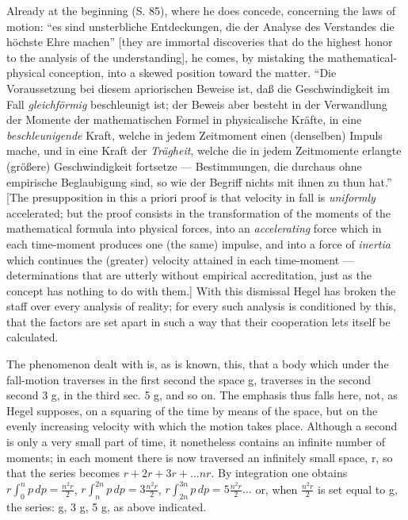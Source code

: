 \documentclass[12pt]{book}
\begin{document}
Already at the beginning (S. 85), where he does concede, concerning the laws of motion: ``es sind
unsterbliche Entdeckungen, die der Analyse des Verstandes die höchste Ehre machen'' [they are immortal
discoveries that do the highest honor to the analysis of the understanding], he comes, by mistaking the
mathematical-physical conception, into a skewed position toward the matter. ``Die Voraussetzung bei
diesem apriorischen Beweise ist, daß die Geschwindigkeit im Fall \emph{gleichförmig} beschleunigt ist;
der Beweis aber besteht in der Verwandlung der Momente der mathematischen Formel in physicalische Kräfte,
in eine \emph{beschleunigende} Kraft, welche in jedem Zeitmoment einen (denselben) Impuls mache, und in
eine Kraft der \emph{Trägheit}, welche die in jedem Zeitmomente erlangte (größere) Geschwindigkeit
fortsetze --- Bestimmungen, die durchaus ohne empirische Beglaubigung sind, so wie der Begriff nichts mit
ihnen zu thun hat.'' [The presupposition in this a priori proof is that velocity in fall is
\emph{uniformly} accelerated; but the proof consists in the transformation of the moments of the
mathematical formula into physical forces, into an \emph{accelerating} force which in each time-moment
produces one (the same) impulse, and into a force of \emph{inertia} which continues the (greater) velocity
attained in each time-moment --- determinations that are utterly without empirical accreditation, just as
the concept has nothing to do with them.]
With this dismissal Hegel has broken the staff over every analysis of reality; for every such analysis is
conditioned by this, that the factors are set apart in such a way that their cooperation lets itself be
calculated.

The phenomenon dealt with is, as is known, this, that a body which under the fall-motion traverses in the
first second the space g, traverses in the second second 3 g, in the third sec. 5 g, and so on. The
emphasis thus falls here, not, as Hegel supposes, on a squaring of the time by means of the space, but on
the evenly increasing velocity with which the motion takes place. Although a second is only a very small
part of time, it nonetheless contains an infinite number of moments; in each moment there is now traversed
an infinitely small space, r, so that the series becomes $r + 2r + 3r + \ldots nr$. By integration one
obtains $r\int_0^n p\,dp = \frac{n^2 r}{2}$, $r\int_n^{2n} p\,dp = 3\frac{n^2 r}{2}$, $r\int_{2n}^{3n}
p\,dp = 5\frac{n^2 r}{2} \ldots$ or, when $\frac{n^2 r}{2}$ is set equal to g, the series: g, 3 g, 5 g, as
above indicated.
\end{document}
